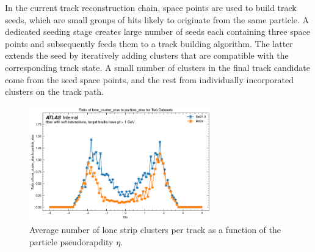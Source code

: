 
In the current track reconstruction chain, space points are used to build track seeds, which are small groups of hits likely to originate from the same particle. 
A dedicated seeding stage creates large number of seeds each containing three space points and subsequently feeds them to a track building algorithm. 
The latter extends the seed by iteratively adding clusters that are compatible with the corresponding track state.
A small number of clusters in the final track candidate come from the seed space points, and the rest from individually incorporated clusters on the track path.

\begin{figure}[h!]
    \centering
    \includegraphics[width=0.7\textwidth]{figures/lone-clusters.png}    
    \caption{Average number of lone strip clusters per track as a function of the particle pseudorapdity $\eta$.}
    \label{fig:lone-cluster-distribution}
\end{figure}

